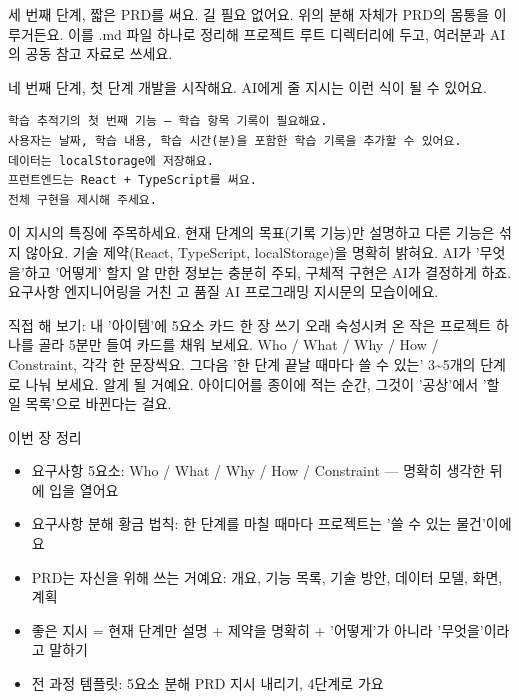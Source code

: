 세 번째 단계, 짧은 PRD를 써요. 길 필요 없어요. 위의 분해 자체가 PRD의 몸통을 이루거든요. 이를 .md 파일 하나로 정리해 프로젝트 루트 디렉터리에 두고, 여러분과 AI의 공동 참고 자료로 쓰세요.

네 번째 단계, 첫 단계 개발을 시작해요. AI에게 줄 지시는 이런 식이 될 수 있어요.

\begin{lstlisting}
학습 추적기의 첫 번째 기능 — 학습 항목 기록이 필요해요.
사용자는 날짜, 학습 내용, 학습 시간(분)을 포함한 학습 기록을 추가할 수 있어요.
데이터는 localStorage에 저장해요.
프런트엔드는 React + TypeScript를 써요.
전체 구현을 제시해 주세요.
\end{lstlisting}

이 지시의 특징에 주목하세요. 현재 단계의 목표(기록 기능)만 설명하고 다른 기능은 섞지 않아요. 기술 제약(React, TypeScript, localStorage)을 명확히 밝혀요. AI가 '무엇을'하고 '어떻게' 할지 알 만한 정보는 충분히 주되, 구체적 구현은 AI가 결정하게 하죠. 요구사항 엔지니어링을 거친 고 품질 AI 프로그래밍 지시문의 모습이에요.

\begin{tcbpractice}{직접 해 보기: 내 '아이템'에 5요소 카드 한 장 쓰기}
오래 숙성시켜 온 작은 프로젝트 하나를 골라 5분만 들여 카드를 채워 보세요. Who / What / Why / How / Constraint, 각각 한 문장씩요. 그다음 '한 단계 끝날 때마다 쓸 수 있는' 3\textasciitilde{}5개의 단계로 나눠 보세요. 알게 될 거예요. 아이디어를 종이에 적는 순간, 그것이 '공상'에서 '할 일 목록'으로 바뀐다는 걸요.

\end{tcbpractice}

\begin{tcbsummary}{이번 장 정리}
\begin{itemize}
  \item 요구사항 5요소: Who / What / Why / How / Constraint — 명확히 생각한 뒤에 입을 열어요
  \item 요구사항 분해 황금 법칙: 한 단계를 마칠 때마다 프로젝트는 '쓸 수 있는 물건'이에요
  \item PRD는 자신을 위해 쓰는 거예요: 개요, 기능 목록, 기술 방안, 데이터 모델, 화면, 계획
  \item 좋은 지시 = 현재 단계만 설명 + 제약을 명확히 + '어떻게'가 아니라 '무엇을'이라고 말하기
  \item 전 과정 템플릿: 5요소 분해 PRD 지시 내리기, 4단계로 가요
\end{itemize}

\end{tcbsummary}
